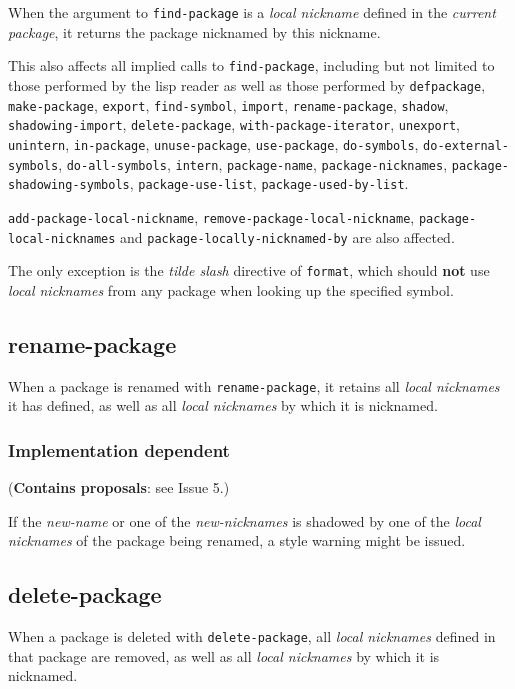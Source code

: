 \documentclass[11pt]{article}
\begin{document}
When the argument to \texttt{find-package} is a \emph{local nickname} defined in the \emph{current
package}, it returns the package nicknamed by this nickname.

This also affects all implied calls to \texttt{find-package}, including but not limited
to those performed by the lisp reader as well as those performed by \texttt{defpackage},
\texttt{make-package}, \texttt{export}, \texttt{find-symbol}, \texttt{import}, \texttt{rename-package}, \texttt{shadow},
\texttt{shadowing-import}, \texttt{delete-package}, \texttt{with-package-iterator}, \texttt{unexport},
\texttt{unintern}, \texttt{in-package}, \texttt{unuse-package}, \texttt{use-package}, \texttt{do-symbols},
\texttt{do-external-symbols}, \texttt{do-all-symbols}, \texttt{intern}, \texttt{package-name},
\texttt{package-nicknames}, \texttt{package-shadowing-symbols}, \texttt{package-use-list},
\texttt{package-used-by-list}.

\texttt{add-package-local-nickname}, \texttt{remove-package-local-nickname},
\texttt{package-local-nicknames} and \texttt{package-locally-nicknamed-by} are also affected.

The only exception is the \emph{tilde slash} directive of \texttt{format}, which should \textbf{not}
use \emph{local nicknames} from any package when looking up the specified symbol.
\subsection{rename-package}
\label{sec:org1f33c8c}
When a package is renamed with \texttt{rename-package}, it retains all \emph{local nicknames}
it has defined, as well as all \emph{local nicknames} by which it is nicknamed.

\subsubsection{Implementation dependent}
\label{sec:orgb30e600}
(\textbf{Contains proposals}: see Issue 5.)

If the \emph{new-name} or one of the \emph{new-nicknames} is shadowed by one of the \emph{local
nicknames} of the package being renamed, a style warning might be issued.
\subsection{delete-package}
\label{sec:orgaffba7b}
When a package is deleted with \texttt{delete-package}, all \emph{local nicknames} defined in
that package are removed, as well as all \emph{local nicknames} by which it is
nicknamed.
\end{document}
